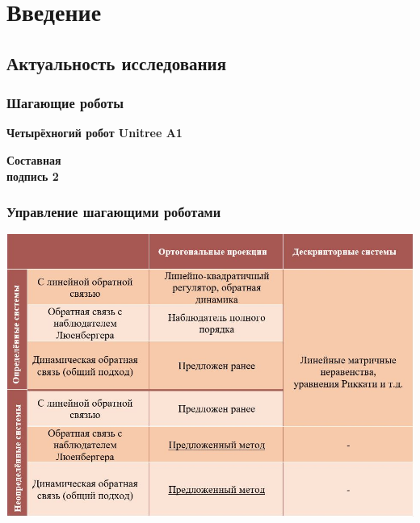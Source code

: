 \section{Введение}

\subsection{Актуальность исследования}

\begin{frame}
	\frametitle{Шагающие роботы}
	    \begin{minipage}[t]{0.47\linewidth}
		\textbf{Четырёхногий робот Unitree A1}
	\end{minipage}
	\hfill
	\begin{minipage}[t]{0.47\linewidth}
		\textbf{Составная \\ подпись 2}
		
	\end{minipage}
\end{frame}

\begin{frame}
    \frametitle{Управление шагающими роботами}
    \centering
	\includegraphics[width=0.85\linewidth]{images/table.JPG} %
\end{frame}

